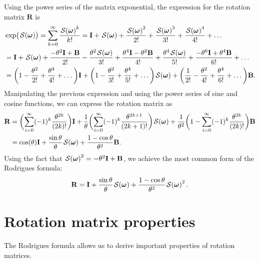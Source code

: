Using the power series of the matrix exponential, the expression for the rotation matrix $\mathbf{R}$ is
\begin{align}
    \begin{split}
    &\exp\bigl(\SL[\boldsymbol{\omega}]\bigr) = \sum_{k=0}^\infty\frac{\SL[\boldsymbol{\omega}]^k}{k!}
    = \mathbf{I} + \SL[\boldsymbol{\omega}] + \frac{\SL[\boldsymbol{\omega}]^2}{2!} + \frac{\SL[\boldsymbol{\omega}]^3}{3!} + \frac{\SL[\boldsymbol{\omega}]^4}{4!} + \dots\\
    &= \mathbf{I} + \SL[\boldsymbol{\omega}] + \frac{-\theta^2\mathbf{I} + \mathbf{B}}{2!} - \frac{\theta^2\SL[\boldsymbol{\omega}]}{3!} + \frac{\theta^4\mathbf{I} - \theta^2\mathbf{B}}{4!} + \frac{\theta^4\SL[\boldsymbol{\omega}]}{5!} + \frac{-\theta^6\mathbf{I}+\theta^4\mathbf{B}}{6!} +\dots\\
    &= \biggl(1 - \frac{\theta^2}{2!} + \frac{\theta^4}{4!} + \dots\biggr)\mathbf{I} + \biggl(1 - \frac{\theta^2}{3!} + \frac{\theta^4}{5!} + \dots\biggr)\SL[\boldsymbol{\omega}] + \biggl(\frac{1}{2!} - \frac{\theta^2}{4!} + \frac{\theta^4}{6!}+\dots\biggr)\mathbf{B}.
    \end{split}
\end{align}
Manipulating the previous expression and using the power series of sine and cosine functions, we can express the rotation matrix as
\begin{align}
    \mathbf{R} &= \biggl(\sum_{i=0}^\infty (-1)^k\frac{\theta^{2k}}{(2k)!}\biggr)\mathbf{I} + \frac{1}{\theta}\biggl(\sum_{i=0}^\infty (-1)^k\frac{\theta^{2k+1}}{(2k+1)!}\biggr)\SL[\boldsymbol{\omega}] + \frac{1}{\theta^2}\biggl(1 - \sum_{i=0}^\infty (-1)^k\frac{\theta^{2k}}{(2k)!}\biggr)\mathbf{B}\\
    &= \cos(\theta)\mathbf{I} + \frac{\sin\theta}{\theta}\SL[\boldsymbol{\omega}] + \frac{1-\cos\theta}{\theta^2}\mathbf{B}.
\end{align}
Using the fact that $\SL[\boldsymbol{\omega}]^2 = -\theta^2\mathbf{I} + \mathbf{B}$, we achieve the most common form of the Rodrigues formula:
\begin{align}
    \mathbf{R} = \mathbf{I} + \frac{\sin\theta}{\theta}\SL[\boldsymbol{\omega}] + \frac{1-\cos\theta}{\theta^2}\SL[\boldsymbol{\omega}]^2.
\end{align}
\section{Rotation matrix properties}\label{subsec:rotation-matrix-properties}
The Rodrigues formula allows us to derive important properties of rotation matrices. 
